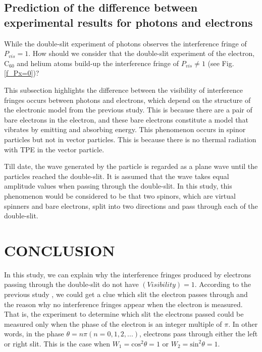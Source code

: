 \documentclass[%
 reprint,
 amsmath,amssymb,
 aps,
]{revtex4-1}
\numberwithin{equation}{section}%
\begin{document}
\subsection{\label{sub:Prediction of the difference between experimental results for photons and electrons}Prediction of the difference between experimental results for photons and electrons}


    While the double-slit experiment of photons observes the interference fringe of $P_{vis} = 1$. How should we consider that the double-slit experiment of the electron, C$_{60}$ and helium atoms build-up the interference fringe of $P_{vis} \neq 1$ (see Fig. \ref{f_Px=0})?

    This subsection highlights the difference between the visibility of interference fringes occurs between photons and electrons, which depend on the structure of the electronic model from the previous study. This is because there are a pair of bare electrons in the electron, and these bare electrons constitute a model that vibrates by emitting and absorbing energy. This phenomenon occurs in spinor particles but not in vector particles. This is because there is no thermal radiation with TPE in the vector particle.

    Till date, the wave generated by the particle is regarded as a plane wave until the particles reached the double-slit. It is assumed that the wave takes equal amplitude values when passing through the double-slit. In this study, this phenomenon would be considered to be that two spinors, which are virtual spinners and bare electrons, split into two directions and pass through each of the double-slit.
    

\section{\label{sec:CONCLUSION}CONCLUSION}


    In this study, we can explain why the interference fringes produced by electrons passing through the double-slit do not have $(Visibility) = 1$. According to the previous study \cite{Hanamura}, we could get a clue which slit the electron passes through and the reason why no interference fringes appear when the electron is measured. That is, the experiment to determine which slit the electrons passed could be measured only when the phase of the electron is an integer multiple of $\pi$. In other words, in the phase $\theta = n \pi (n = 0,1,2,...)$, electrons pass through either the left or right slit. This is the case when $W_{1} = \mathrm{cos}^{2} \theta = 1$ or $W_{2} = \mathrm{sin}^{2} \theta = 1$.
    
\end{document}

